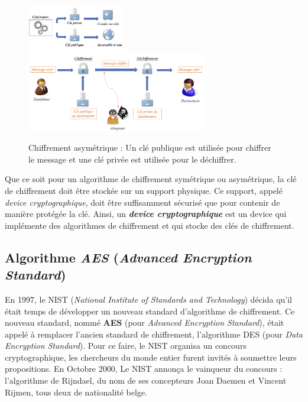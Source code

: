 \documentclass[10pt, oneside, a4paper]{article}
\begin{document}
\begin{figure}[htbp]
    \centering
    \includegraphics[width=0.38\textwidth]{image/cle_asymetrique}
    \includegraphics[width=0.7\textwidth]{image/asymetrique}
    \caption{Chiffrement asymétrique : Un clé publique est utilisée pour chiffrer le message et une clé privée est utilisée pour le déchiffrer.}
    \label{fig:asymétrique}
\end{figure}


Que ce soit pour un algorithme de chiffrement symétrique ou asymétrique, la clé de chiffrement doit être stockée sur un support physique. Ce support, appelé \textit{device cryptographique}, doit être suffisamment sécurisé que pour contenir de manière protégée la clé. Ainsi, un \textbf{\textit{device cryptographique}} est un device qui implémente des algorithmes de chiffrement et qui stocke des clés de chiffrement.

\subsection{Algorithme \textit{AES} (\textit{Advanced Encryption Standard})}
\label{sec:AES}

En 1997, le NIST (\textit{National Institute of Standards and Technology}) décida qu'il était temps de développer un nouveau standard d'algorithme de chiffrement. Ce nouveau standard, nommé \textbf{AES} (pour \textit{Advanced Encryption Standard}), était appelé à remplacer l'ancien standard de chiffrement, l'algorithme DES (pour \textit{Data Encryption Standard}). Pour ce faire, le NIST organisa un concours cryptographique, les chercheurs du monde entier furent invités à soumettre leurs propositions. En Octobre 2000, Le NIST annonça le vainqueur du concours : l'algorithme de Rijndael, du nom de ses concepteurs Joan Daemen et Vincent Rijmen, tous deux de nationalité belge.
\end{document}
